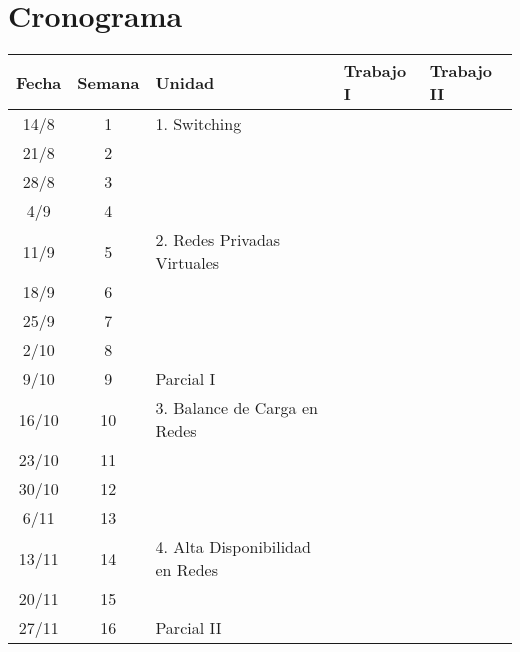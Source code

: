
\section {Cronograma}
\begin{tabular}{c|c|l|l|l}
Fecha & Semana & Unidad & Trabajo I & Trabajo II\\
\hline
\hline
14/8 & 1	& 	1. Switching 			& 	& \\
21/8 & 2 	& 				 	& 	& \\
28/8 & 3	& 					&	& \\
4/9 & 4 	& 					&	& \\
\hline
\hline
11/9 & 5	& 	2. Redes Privadas Virtuales 	& 	& \\
18/9 & 6	& 					&	& \\
25/9 & 7 	& 					&   & \\
2/10 & 8	& 					&  	& \\ 
9/10& 9		& 	Parcial I			& 	& \\
\hline
\hline
16/10 & 10	& 	3. Balance de Carga en Redes	& 	& \\ 
23/10 & 11	& 					& 	& \\
30/10 & 12	& 					&	& \\
6/11 & 13	& 					&	& \\
\hline
\hline
13/11 & 14	& 	4. Alta Disponibilidad en Redes	&	& \\
20/11 & 15	& 					&	& \\
27/11 & 16	& 	Parcial II			&	& \\ 
\hline
\end{tabular}




